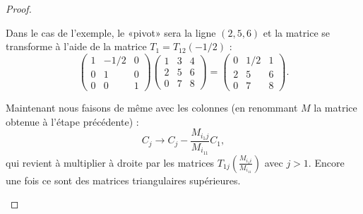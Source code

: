 \begin{proof}
\begin{subproof}
        Dans le cas de l'exemple, le «pivot» sera la ligne \( (2,5,6)\) et la matrice se transforme à l'aide de la matrice \( T_1=T_{12}(-1/2)\) :
        \begin{equation}    \label{EqyjXIYf}
            \begin{pmatrix}
                1    &   -1/2    &   0    \\
                0    &   1    &   0    \\
                0    &   0    &   1
            \end{pmatrix}
            \begin{pmatrix}
                1    &   3    &   4    \\
                2    &   5    &   6    \\
                0    &   7    &   8
            \end{pmatrix}=
            \begin{pmatrix}
                0    &   1/2    &   1    \\
                2    &   5    &   6    \\
                0    &   7    &   8
            \end{pmatrix}.
        \end{equation}

    
    Maintenant nous faisons de même avec les colonnes (en renommant \( M\) la matrice obtenue à l'étape précédente) :
    \begin{equation}
        C_j\to C_j-\frac{ M_{i_1j} }{ M_{i_11} }C_1,
    \end{equation}
    qui revient à multiplier à droite par les matrices \( T_{1j}(\frac{ M_{i_1i} }{ M_{i_11} })\) avec \( j>1\). Encore une fois ce sont des matrices triangulaires supérieures.


\end{subproof}
\end{proof}
